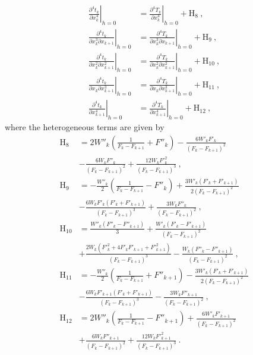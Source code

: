 \begin{align}
\left. \frac{\partial^4 t_k }{\partial x_k^4}\right\rvert_{h=0} & = \left. \frac{\partial^4 T_k }{\partial x_k^4}\right\rvert_{h=0} + \text{H}_8~,\\
\nonumber
\left. \frac{\partial^4 t_k }{\partial x_k^3 \partial x_{k+1}}\right\rvert_{h=0} & = \left. \frac{\partial^4 T_k }{\partial x_k^3 \partial x_{k+1}}\right\rvert_{h=0}  + \text{H}_9~,\\
\nonumber
\left. \frac{\partial^4 t_k }{\partial x_k^2 \partial x_{k+1}^2}\right\rvert_{h=0} & = \left. \frac{\partial^4 T_k }{\partial x_k^2 \partial x_{k+1}^2}\right\rvert_{h=0} + \text{H}_{10}~,\\
\nonumber
\left. \frac{\partial^4 t_k }{\partial x_k \partial x_{k+1}^3}\right\rvert_{h=0} & = \left. \frac{\partial^4 T_k }{\partial x_k \partial x_{k+1}^3}\right\rvert_{h=0} + \text{H}_{11}~,\\
\nonumber
\left. \frac{\partial^4 t_k }{\partial x_{k+1}^4}\right\rvert_{h=0} & = \left. \frac{\partial^4 T_k }{\partial x_{k+1}^4}\right\rvert_{h=0} + \text{H}_{12}~,
\end{align}
where the heterogeneous terms are given by
\begin{align}
\text{H}_8 &  =  2W''_k\left(\frac{1}{F_k-F_{k+1}} + F''_{k} \right) - \frac{6W'_k F'_k}{(F_k-F_{k+1})^2} \\
\nonumber
\nonumber
& - \frac{6 W_k F''_{k} }{(F_k-F_{k+1})^2} + \frac{12 W_k F'^2_{k} }{(F_k-F_{k+1})^3} ~,\\
\nonumber
\text{H}_9 &  =   -\frac{W''_k}{2} \left(\frac{1}{F_k-F_{k+1}} - F''_{k} \right) + \frac{3W'_k(F'_k+F'_{k+1})}{2(F_k-F_{k+1})^2}\\
\nonumber
&  - \frac{6 W_k F'_{k}(F'_k+F'_{k+1}) }{(F_k-F_{k+1})^3}  + \frac{3 W_k F''_{k} }{(F_k-F_{k+1})^2} ~,\\
\nonumber
\text{H}_{10} &  =  \frac{W''_k(F''_k-F''_{k+1})}{3} + \frac{W'_k(F'_k-F'_{k+1})}{(F_k-F_{k+1})^2} \\
\nonumber
& + \frac{2W_k (F'^2_k + 4F'_k F'_{k+1} + F'^2_{k+1}) }{(F_k-F_{k+1})^3} - \frac{W_k (F''_k - F''_{k+1}) }{(F_k-F_{k+1})^2}~,\\
\nonumber
\text{H}_{11} &  =  -\frac{W''_k}{2} \left(\frac{1}{F_k-F_{k+1}} + F''_{k+1} \right) - \frac{3W'_k(F'_k+F'_{k+1})}{2(F_k-F_{k+1})^2} \\
\nonumber
&  - \frac{6 W_k F'_{k+1}(F'_k+F'_{k+1}) }{(F_k-F_{k+1})^3}  - \frac{3 W_k F''_{k+1} }{(F_k-F_{k+1})^2} ~,\\
\nonumber
\text{H}_{12} &  =   2W''_k\left(\frac{1}{F_k-F_{k+1}} - F''_{k+1} \right) + \frac{6W'_k F'_{k+1}}{(F_k-F_{k+1})^2} \\
\nonumber
& + \frac{6 W_k F''_{k+1} }{(F_k-F_{k+1})^2} + \frac{12 W_k F'^2_{k+1} }{(F_k-F_{k+1})^3} ~.
\end{align}

